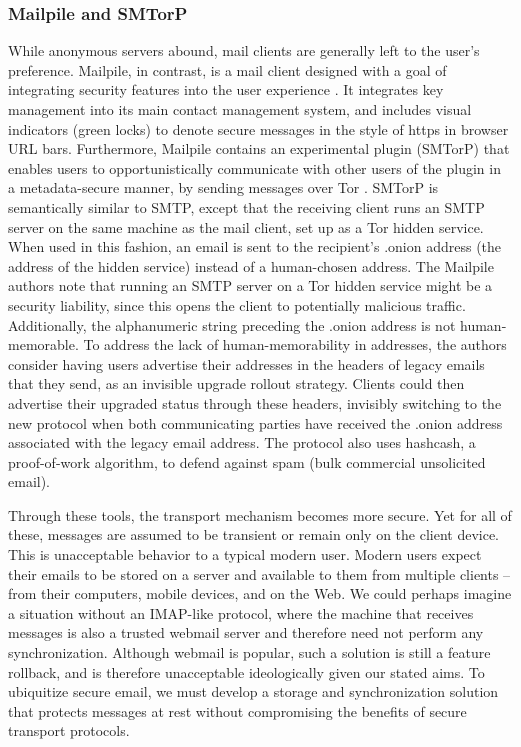 \documentclass[pageno]{jpaper}
\begin{document}
\subsubsection{Mailpile and SMTorP}
While anonymous servers abound, mail clients are generally left to the user's preference. Mailpile, in contrast, is a mail client designed with a goal of integrating security features into the user experience \cite{mailpile}. It integrates key management into its main contact management system, and includes visual indicators (green locks) to denote secure messages in the style of https in browser URL bars. Furthermore, Mailpile contains an experimental plugin (SMTorP) that enables users to opportunistically communicate with other users of the plugin in a metadata-secure manner, by sending messages over Tor \cite{smtorp}. SMTorP is semantically similar to SMTP, except that the receiving client runs an SMTP server on the same machine as the mail client, set up as a Tor hidden service. When used in this fashion, an email is sent to the recipient's .onion address (the address of the hidden service) instead of a human-chosen address. The Mailpile authors note that running an SMTP server on a Tor hidden service might be a security liability, since this opens the client to potentially malicious traffic. Additionally, the alphanumeric string preceding the .onion address is not human-memorable. To address the lack of human-memorability in addresses, the authors consider having users advertise their addresses in the headers of legacy emails that they send, as an invisible upgrade rollout strategy. Clients could then advertise their upgraded status through these headers, invisibly switching to the new protocol when both communicating parties have received the .onion address associated with the legacy email address. The protocol also uses hashcash, a proof-of-work algorithm, to defend against spam (bulk commercial unsolicited email).


Through these tools, the transport mechanism becomes more secure. Yet for all of these, messages are assumed to be transient or remain only on the client device. This is unacceptable behavior to a typical modern user. Modern users expect their emails to be stored on a server and available to them from multiple clients -- from their computers, mobile devices, and on the Web. We could perhaps imagine a situation without an IMAP-like protocol, where the machine that receives messages is also a trusted webmail server and therefore need not perform any synchronization. Although webmail is popular, such a solution is still a feature rollback, and is therefore unacceptable ideologically given our stated aims. To ubiquitize secure email, we must develop a storage and synchronization solution that protects messages at rest without compromising the benefits of secure transport protocols.
\end{document}
